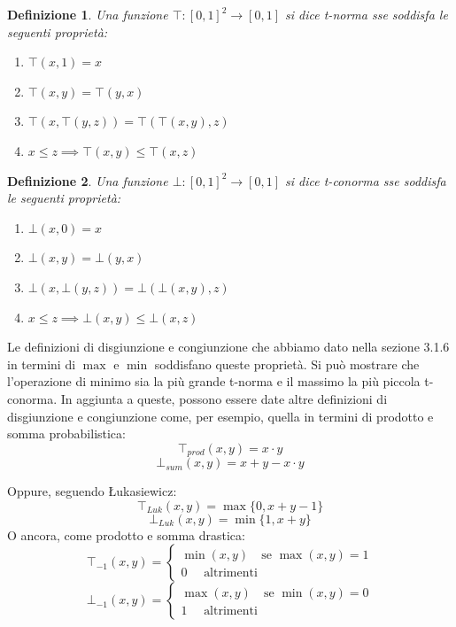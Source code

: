 \documentclass[10pt,a4paper]{article}
\newtheorem{definition}{Definizione}
\begin{document}
\begin{definition}
Una funzione $\top : [0,1]^2 \to [0,1]$ si dice \emph{t-norma} sse soddisfa le seguenti proprietà:
\begin{enumerate}
\item{$\top(x,1) = x$}
\item{$\top(x,y) = \top(y,x)$}
\item{$\top(x,\top(y,z)) = \top(\top(x,y),z)$}
\item{$x \leq z \implies \top(x,y) \leq \top(x,z)$}
\end{enumerate}
\end{definition}

\begin{definition}
Una funzione $\bot: [0,1]^2 \to [0,1]$ si dice \emph{t-conorma} sse soddisfa le seguenti proprietà:
\begin{enumerate}
\item{$\bot(x,0) = x$}
\item{$\bot(x,y) = \bot(y,x)$}
\item{$\bot(x,\bot(y,z)) = \bot(\bot(x,y),z)$}
\item{$x \leq z \implies \bot(x,y) \leq \bot(x,z)$}
\end{enumerate}
\end{definition}

Le definizioni di disgiunzione e congiunzione che abbiamo dato nella sezione 3.1.6 in termini di $\max$ e $\min$ soddisfano queste proprietà. Si può mostrare che l'operazione di minimo sia la più grande t-norma e il massimo la più piccola t-conorma. In aggiunta a queste, possono essere date altre definizioni di disgiunzione e congiunzione come, per esempio, quella in termini di prodotto e somma probabilistica:
$$
\top_{prod}(x,y) = x \cdot y
$$
$$
\bot_{sum} (x,y) = x + y - x \cdot y
$$

Oppure, seguendo Łukasiewicz:
$$
\top_{Luk}(x,y) = \max\{0,x + y - 1\}
$$
$$
\bot_{Luk}(x,y) = \min\{1,x + y\}
$$
O ancora, come prodotto e somma drastica:
$$
\top_{-1}(x,y) = \begin{cases}
				\min(x,y) \quad \text{se } \max(x,y) = 1 \\
				0 \quad \text{ altrimenti}  
				\end{cases}
$$
$$
\bot_{-1}(x,y) = \begin{cases}
				\max(x,y) \quad \text{se } \min(x,y) = 0 \\
				1 \quad \text{ altrimenti}  
				\end{cases}
$$
\end{document}
